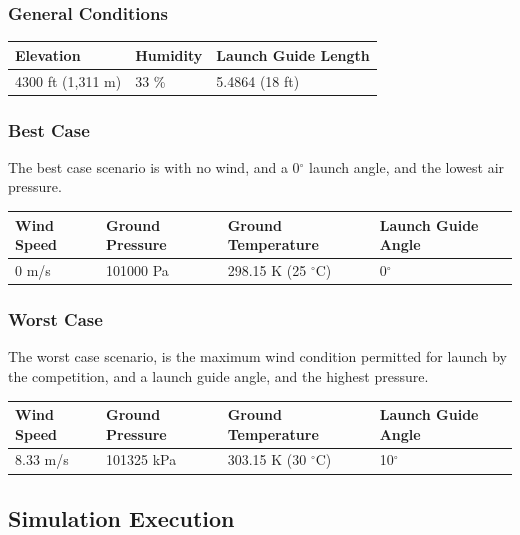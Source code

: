 \documentclass[]{article}
\begin{document}

\subsubsection{General Conditions}\label{general-conditions}

\begin{longtable}[c]{@{}lll@{}}
\toprule
Elevation & Humidity & Launch Guide Length\tabularnewline
\midrule
\endhead
4300 ft (1,311 m) & 33 \% & 5.4864 (18 ft)\tabularnewline
\bottomrule
\end{longtable}


\subsubsection{Best Case}\label{best-case}

The best case scenario is with no wind, and a 0\(^\circ\) launch angle,
and the lowest air pressure.

\begin{longtable}[c]{@{}llll@{}}
\toprule
Wind Speed & Ground Pressure & Ground Temperature & Launch Guide
Angle\tabularnewline
\midrule
\endhead
0 m/s & 101000 Pa & 298.15 K (25 \(^\circ\)C) &
0\(^\circ\)\tabularnewline
\bottomrule
\end{longtable}


\subsubsection{Worst Case}\label{worst-case}

The worst case scenario, is the maximum wind condition permitted for
launch by the competition, and a launch guide angle, and the highest
pressure.

\begin{longtable}[c]{@{}llll@{}}
\toprule
Wind Speed & Ground Pressure & Ground Temperature & Launch Guide
Angle\tabularnewline
\midrule
\endhead
8.33 m/s & 101325 kPa & 303.15 K (30 \(^\circ\)C) &
10\(^\circ\)\tabularnewline
\bottomrule
\end{longtable}


\clearpage

\subsection{Simulation Execution}\label{simulation-execution-1}
\end{document}
